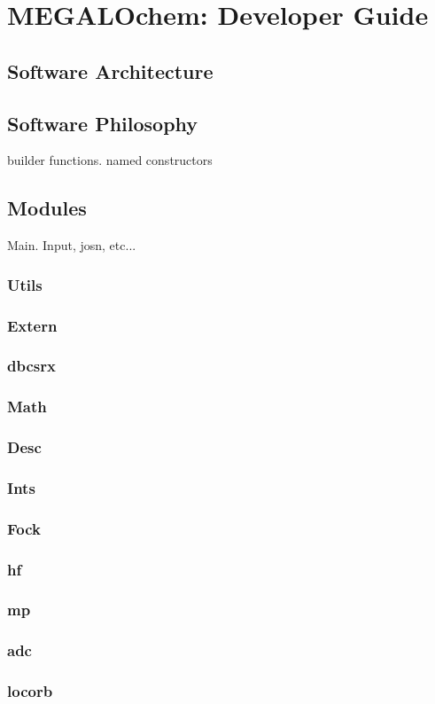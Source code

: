 \chapter{MEGALOchem: Developer Guide}

\section{Software Architecture}

\section{Software Philosophy}

builder functions. named constructors

\section{Modules}

Main. Input, josn, etc...

\subsection{Utils}

\subsection{Extern}

\subsection{dbcsrx}

\subsection{Math}

\subsection{Desc}

\subsection{Ints}

\subsection{Fock}

\subsection{hf}

\subsection{mp}

\subsection{adc}

\subsection{locorb}